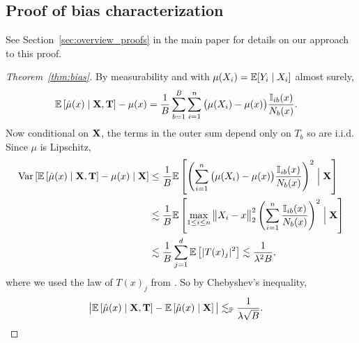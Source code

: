 \subsection*{Proof of bias characterization}

See Section~\ref{sec:overview_proofs} in the main paper
for details on our approach to this proof.

\begin{proof}[Theorem~\ref{thm:bias}]


  By measurability and with $\mu(X_i) = \mathbb{E}[Y_i \mid X_i]$ almost surely,
  \begin{align*}
    \mathbb{E} \left[ \hat \mu(x) \mid \mathbf{X}, \mathbf{T} \right]
    - \mu(x)
    &=
    \frac{1}{B}
    \sum_{b=1}^B
    \sum_{i=1}^n \big( \mu(X_i) - \mu(x) \big)
    \frac{\mathbb{I}_{i b}(x)}{N_b(x)}.
  \end{align*}
  Now conditional on $\mathbf{X}$,
  the terms in the outer sum depend only on $T_b$ so are i.i.d.
  Since $\mu$ is Lipschitz,
  \begin{align*}
    \operatorname{Var} \left[
      \mathbb{E} \left[ \hat \mu(x) \mid \mathbf{X}, \mathbf{T} \right]
      - \mu(x)
      \mid \mathbf{X}
    \right]
    &\leq
    \frac{1}{B}
    \mathbb{E} \left[
      \left(
        \sum_{i=1}^n \big( \mu(X_i) - \mu(x) \big)
        \frac{\mathbb{I}_{i b}(x)}{N_b(x)}
      \right)^2
      \Bigm| \mathbf{X}
    \right] \\
    &\lesssim
    \frac{1}{B}
    \mathbb{E} \left[
      \max_{1 \leq i \leq n}
      \big\| X_i - x \big\|_2^2
      \left(
        \sum_{i=1}^n
        \frac{\mathbb{I}_{i b}(x)}{N_b(x)}
      \right)^2
      \Bigm| \mathbf{X}
    \right] \\
    &\lesssim
    \frac{1}{B}
    \sum_{j=1}^{d}
    \mathbb{E} \left[
      |T(x)_j|^2
    \right]
    \lesssim
    \frac{1}{\lambda^2 B},
  \end{align*}
  where we used the law of $T(x)_j$ from
  \citet[Proposition~1]{mourtada2020minimax}.
  So by Chebyshev's inequality,
  \begin{align*}
    \big|
    \mathbb{E} \left[ \hat \mu(x) \mid \mathbf{X}, \mathbf{T} \right]
    - \mathbb{E} \left[ \hat \mu(x) \mid \mathbf{X} \right]
    \big|
    &\lesssim_{\mathbb{P}}
    \frac{1}{\lambda \sqrt B}.
  \end{align*}



\end{proof}

